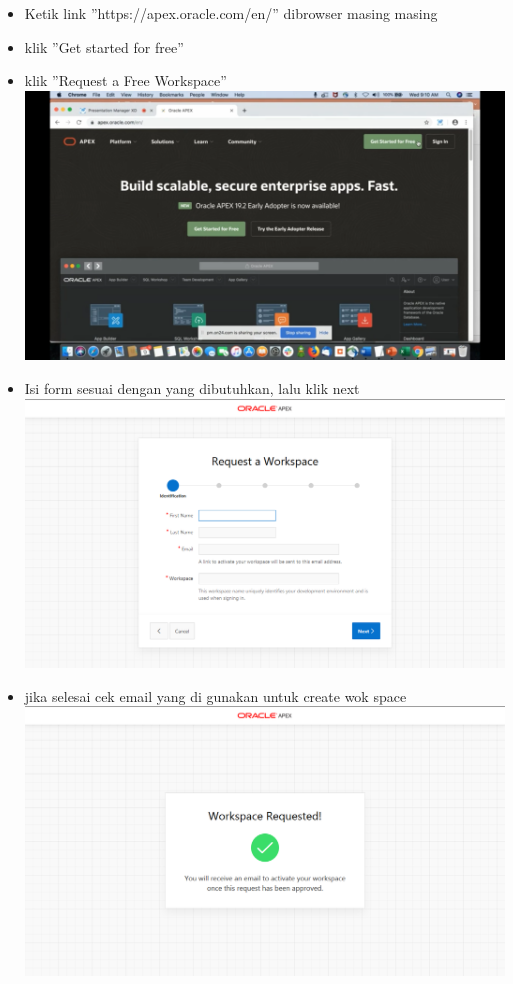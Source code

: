 \documentclass[12pt]{article}
\begin{document}
\begin{itemize}
	\item Ketik link ”https://apex.oracle.com/en/” dibrowser masing masing
	\item klik ”Get started for free”
	\item klik ”Request a Free Workspace” \\	\includegraphics[scale=0.3]{pic/1}
	\item Isi form sesuai dengan yang dibutuhkan, lalu klik next\\	\includegraphics[scale=0.3]{pic/2}\\
	
	\item jika selesai cek email yang di gunakan untuk create wok space	\includegraphics[scale=0.3]{pic/3}


\end{itemize}
\end{document}

